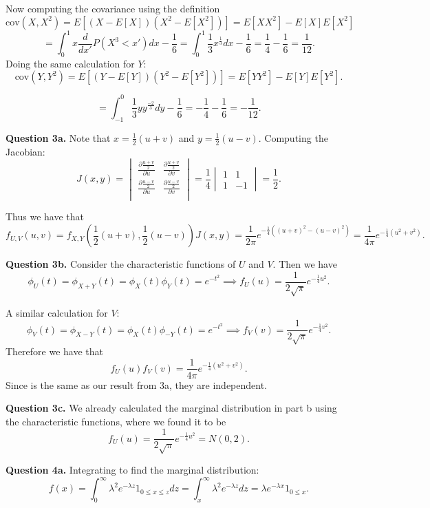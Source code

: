 \documentclass[letterpaper, reqno,11pt]{article}
\begin{document}
Now computing the covariance using the definition
\[
    \text{cov}(X, X^2)=E\left[(X-E[X])(X^2-E[X^2])\right]=E[XX^2]-E[X]E[X^2]%
\]
\[
    =\int_0^{1}x \frac{d}{dx'}P(X^3<x')dx-\frac{1}{6}=\int_0^{1}\frac{1}{3}x^{\frac{1}{3}}dx-\frac{1}{6}=\frac{1}{4}-\frac{1}{6}=\frac{1}{12}
.\]
Doing the same calculation for $Y$: 
\[
    \text{cov}(Y, Y^2)=E\left[(Y-E[Y])(Y^2-E[Y^2])\right]=E[YY^2]-E[Y]E[Y^2]%
.\]

\[
    =\int_{-1}^{0}\frac{1}{3}y y^{\frac{-2}{3}}dy-\frac{1}{6}=-\frac{1}{4}-\frac{1}{6}=-\frac{1}{12}
.\]

{\medskip\noindent\bf Question 3a.} Note that $x=\frac{1}{2}\left( u+v \right) $ and $y=\frac{1}{2}\left( u-v \right) $. Computing the Jacobian: 
\[
    J(x,y)=\begin{vmatrix}\frac{\partial \frac{u+v}{2}}{\partial u} & \frac{\partial \frac{u+v}{2}}{\partial v}\\\frac{\partial \frac{u-v}{2}}{\partial u} & \frac{\partial \frac{u-v}{2}}{\partial v}\\\end{vmatrix}=\frac{1}{4}\begin{vmatrix}1&1\\1&-1\end{vmatrix}=\frac{1}{2}
.\]

Thus we have that
\[
f_{U,V}(u,v)=f_{X,Y}(\frac{1}{2}(u+v),\frac{1}{2}(u-v)) J(x,y)=\frac{1}{2\pi}e^{-\frac{1}{4}\left((u+v)^2-(u-v)^2\right)}=\frac{1}{4\pi}e^{-\frac{1}{4}\left( u^2+v^2 \right) }
.\]

{\medskip\noindent\bf Question 3b.} Consider the characteristic functions of $U$ and $V$. Then we have 
\[
    \phi_U(t)=\phi_{X+Y}(t)=\phi_X(t)\phi_Y(t)=e^{-t^2}\implies f_U(u)=\frac{1}{2\sqrt{\pi }}e^{-\frac{1}{4}u^2}
.\]

A similar calculation for $V$:
\[
    \phi_V(t)=\phi_{X-Y}(t)=\phi_X(t)\phi_{-Y}(t)=e^{-t^2}\implies f_V(v)=\frac{1}{2\sqrt{\pi}}e^{-\frac{1}{4}v^2}
.\]
Therefore we have that 
\[
f_U(u)f_V(v)=\frac{1}{4\pi}e^{-\frac{1}{4}\left(u^2+v^2\right)}
.\]
Since is the same as our result from 3a, they are independent.

{\medskip\noindent\bf Question 3c.} We already calculated the marginal distribution in part b using the characteristic functions, where we found it to be
\[
f_U(u)=\frac{1}{2\sqrt{\pi} }e^{-\frac{1}{4}u^2}=N(0,2)
.\]

{\medskip\noindent\bf Question 4a.} Integrating to find the marginal distribution:
\[
f(x)=\int_0^{\infty}\lambda^2e^{-\lambda z}1_{0\leq x\leq z}dz=\int_x^{\infty}\lambda^2e^{-\lambda z}dz=\lambda e^{-\lambda x}1_{0\leq x}
.\]
\end{document}
